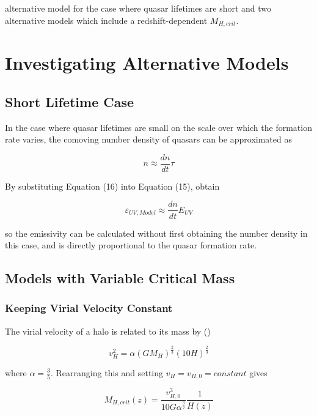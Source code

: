 \documentclass[12pt, twocolumn]{report}%
\begin{document}
\twocolumngrid


\noindent alternative model for the case where quasar lifetimes are short and two alternative models which include a redshift-dependent $M_{H,crit}$.

\section{Investigating Alternative Models}

\subsection{Short Lifetime Case}

In the case where quasar lifetimes are small on the scale over which the formation rate varies, the comoving number density of quasars can be approximated as

\begin{equation}
    n\approx\frac{dn}{dt}\tau
\end{equation}

\noindent By substituting Equation (16) into Equation (15), obtain

\begin{equation}
    \varepsilon_{UV,Model}\approx\frac{dn}{dt}E_{UV}
\end{equation}

\noindent so the emissivity can be calculated without first obtaining the number density in this case, and is directly proportional to the quasar formation rate.

\subsection{Models with Variable Critical Mass}
\subsubsection{Keeping Virial Velocity Constant}

The virial velocity of a halo is related to its mass by (\cite{Ikea})

\begin{equation}
    v_H^2=\alpha(GM_H)^{\frac{2}{3}}(10H)^{\frac{2}{3}}
\end{equation}

\noindent where $\alpha=\frac{3}{5}$. Rearranging this and setting $v_H=v_{H,0}=constant$ gives

\begin{equation}
    M_{H,crit}(z)=\frac{v_{H,0}^3}{10G\alpha^{\frac{3}{2}}}\frac{1}{H(z)}
\end{equation}
\end{document}

